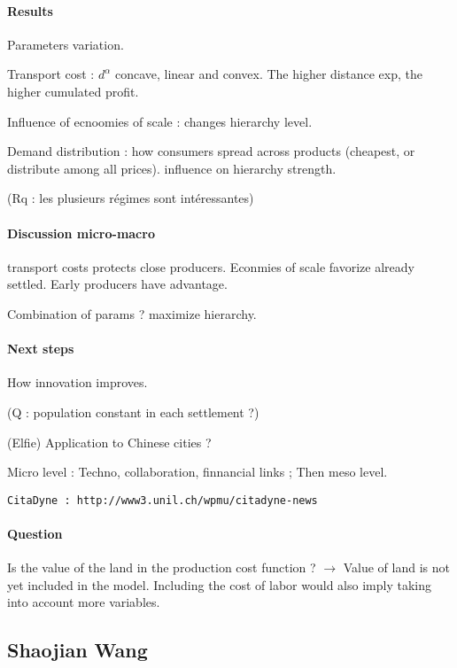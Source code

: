 \documentclass[11pt]{article}
\begin{document}
\paragraph{Results} 

Parameters variation.

Transport cost : $d^{\alpha}$ concave, linear and convex. The higher distance exp, the higher cumulated profit.

Influence of ecnoomies of scale : changes hierarchy level.

Demand distribution : how consumers spread across products (cheapest, or distribute among all prices).
influence on hierarchy strength. 

(Rq : les plusieurs régimes sont intéressantes)

\paragraph{Discussion micro-macro}

transport costs protects close producers.
Econmies of scale favorize already settled.
Early producers have advantage.


Combination of params ? maximize hierarchy.


\paragraph{Next steps}

How innovation improves.

(Q : population constant in each settlement ?)

(Elfie)
Application to Chinese cities ?

Micro level : Techno, collaboration, finnancial links ; Then meso level.

\texttt{CitaDyne : http://www3.unil.ch/wpmu/citadyne-news}


\paragraph{Question}

Is the value of the land in the production cost function ? $\rightarrow$ Value of land is not yet included in the model. Including the cost of labor would also imply taking into account more variables.




\subsection*{Shaojian Wang}
\end{document}
